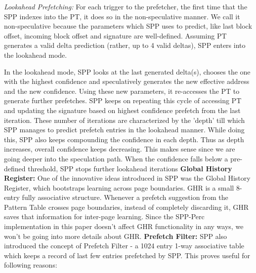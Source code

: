 \documentclass{sig-alternate}
\begin{document}
\textit{Lookahead Prefetching:} For each trigger to the prefetcher, the first time that the SPP indexes into the PT, it does so in the non-speculative manner. 
We call it non-speculative because the parameters which SPP uses to predict, like last block offset, incoming block offset and signature are well-defined. 
Assuming PT generates a valid delta prediction (rather, up to 4 valid deltas), SPP enters into the lookahead mode.

In the lookahead mode, SPP looks at the last generated delta(s), chooses the one with the highest confidence and speculatively generates the new effective address and the new confidence. 
Using these new parameters, it re-accesses the PT to generate further prefetches. 
SPP keeps on repeating this cycle of accessing PT and updating the signature based on highest confidence prefetch from the last iteration. 
These number of iterations are characterized by the 'depth' till which SPP manages to predict prefetch entries in the lookahead manner. 
While doing this, SPP also keeps compounding the confidence in each depth. 
Thus as depth increases, overall confidence keeps decreasing. 
This makes sense since we are going deeper into the speculation path. 
When the confidence falls below a pre-defined threshold, SPP stops further lookahead iterations
\newline
\newline
\textbf{Global History Register:} One of the innovative ideas introduced in SPP was the Global History Register, which bootstraps learning across page boundaries.
GHR is a small 8-entry fully associative structure. 
Whenever a prefetch suggestion from the Pattern Table crosses page boundaries, instead of completely discarding it, GHR saves that information for inter-page learning.
Since the SPP-Perc implementation in this paper doesn't affect GHR functionality in any ways, we won't be going into more details about GHR.
\newline
\newline
\textbf{Prefetch Filter:} SPP also introduced the concept of Prefetch Filter - a 1024 entry 1-way associative table which keeps a record of last few entries prefetched by SPP. 
This proves useful for following reasons:
\end{document}
